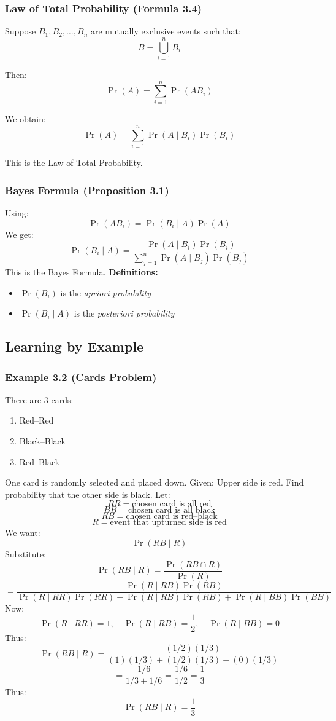 \documentclass[12pt]{article}
\begin{document}
\subsubsection*{Law of Total Probability (Formula 3.4)}

Suppose $B_1,B_2,\dots,B_n$ are mutually exclusive events such that:
\[
B=\bigcup_{i=1}^{n}B_i
\]

Then:
\[
\Pr(A)=\sum_{i=1}^{n}\Pr(AB_i)
\]

We obtain:
\[
\Pr(A)=\sum_{i=1}^{n}\Pr(A\mid B_i)\Pr(B_i)
\]

This is the Law of Total Probability.

\subsubsection*{Bayes Formula (Proposition 3.1)}

Using:
\[
\Pr(AB_i)=\Pr(B_i\mid A)\Pr(A)
\]
We get:
\[
\Pr(B_i\mid A)=
\frac{\Pr(A\mid B_i)\Pr(B_i)}
{\sum_{j=1}^{n}\Pr(A\mid B_j)\Pr(B_j)}
\]
This is the Bayes Formula.
\textbf{Definitions:}
\begin{itemize}
    \item $\Pr(B_i)$ is the \textit{apriori probability}
    \item $\Pr(B_i\mid A)$ is the \textit{posteriori probability}
\end{itemize}
\subsection{Learning by Example}
\subsubsection*{Example 3.2 (Cards Problem)}
There are 3 cards:
\begin{enumerate}
    \item Red--Red
    \item Black--Black
    \item Red--Black
\end{enumerate}
One card is randomly selected and placed down.
Given: Upper side is red.
Find probability that the other side is black.
Let:
\[
RR=\text{chosen card is all red}
\]
\[
BB=\text{chosen card is all black}
\]
\[
RB=\text{chosen card is red--black}
\]
\[
R=\text{event that upturned side is red}
\]
We want:
\[
\Pr(RB\mid R)
\]
Substitute:
\[
\Pr(RB\mid R)=\frac{\Pr(RB\cap R)}{\Pr(R)}
\]
\[
=\frac{\Pr(R\mid RB)\Pr(RB)}
{\Pr(R\mid RR)\Pr(RR)+\Pr(R\mid RB)\Pr(RB)+\Pr(R\mid BB)\Pr(BB)}
\]
Now:
\[
\Pr(R\mid RR)=1,\quad \Pr(R\mid RB)=\frac12,\quad \Pr(R\mid BB)=0
\]
Thus:
\[
\Pr(RB\mid R)=
\frac{(1/2)(1/3)}
{(1)(1/3)+(1/2)(1/3)+(0)(1/3)}
\]
\[
=\frac{1/6}{1/3+1/6}
=\frac{1/6}{1/2}
=\frac{1}{3}
\]
Thus:
\[
\Pr(RB\mid R)=\frac13
\]
\end{document}
